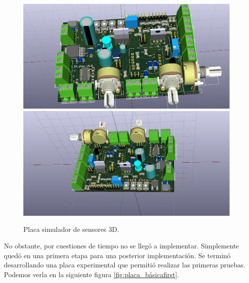 \begin{figure}[!hp]
  \centering
  \includegraphics[scale=0.3]{./Figures/pcb_3d.png}
  \includegraphics[scale=0.3]{./Figures/pcb_3d_back.png}
  \caption{Placa simulador de sensores 3D.}
  \label{fig:pcb3d}
\end{figure}

No obstante, por cuestiones de tiempo no se llegó a implementar. Simplemente quedó en una primera etapa para una posterior implementación. Se terminó desarrollando una placa experimental que permitió realizar las primeras pruebas. Podemos verla en la siguiente figura \ref{fig:placa_básicafirst}.

